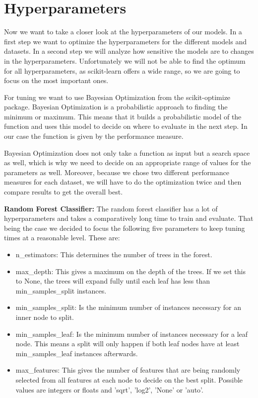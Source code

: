 \documentclass[a4paper,10pt]{article}
\begin{document}
\section{Hyperparameters}
\label{sec:hyperparameters}
Now we want to take a closer look at the hyperparameters of our models. In a first step we want to optimize the hyperparameters for the different models and datasets.
In a second step we will analyze how sensitive the models are to changes in the hyperparameters. Unfortunately we will not be able to find the optimum for all hyperparameters, as scikit-learn offers a wide range, so we are going to focus on the most important ones.

For tuning we want to use Bayesian Optimization from the scikit-optimize package. Bayesian Optimization is a probabilistic approach to finding the minimum or maximum. This means that it builds a probabilistic model of the function and uses this model to decide on where to evaluate in the next step. In our case the function is given by the performance measure. 

Bayesian Optimization does not only take a function as input but a search space as well, which is why we need to decide on an appropriate range of values for the parameters as well. Moreover, because we chose two different performance measures for each dataset, we will have to do the optimization twice and then compare results to get the overall best.

\textbf{Random Forest Classifier:} The random forest classifier has a lot of hyperparameters and takes a comparatively long time to train and evaluate. That being the case we decided to focus the following five parameters to keep tuning times at a reasonable level. These are:

\begin{itemize}
    \item \textsf{n\_estimators}: This determines the number of trees in the forest.
\item \textsf{max\_depth}: This gives a maximum on the depth of the trees. If we set this to None, the trees will expand fully until each leaf has less than \textsf{min\_samples\_split} instances.
\item \textsf{min\_samples\_split}: Is the minimum number of instances necessary for an inner node to split.
\item \textsf{min\_samples\_leaf}: Is the minimum number of instances necessary for a leaf node. This means a split will only happen if both leaf nodes have at least \textsf{min\_samples\_leaf} instances afterwards.
\item \textsf{max\_features}: This gives the number of features that are being randomly selected from all features at each node to decide on the best split. Possible values are integers or floats and 'sqrt', 'log2', 'None' or 'auto'.
\end{itemize}
\end{document}
